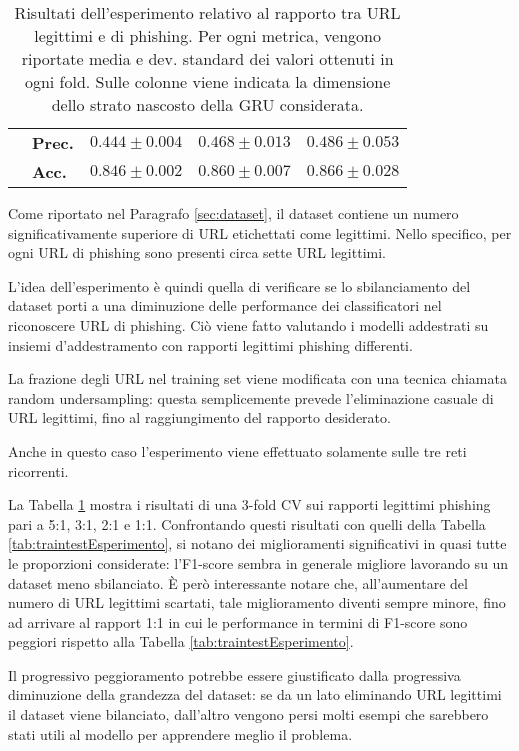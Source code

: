 \documentclass[../../main.tex]{subfiles}
\begin{document}
\begin{table}[ht]
\begin{tabular}{llccc}
            &\textbf{Prec.}     &      $0.444 \pm 0.004$ & $0.468 \pm 0.013$ & $0.486 \pm 0.053$\\
            &\textbf{Acc.}   &      $0.846 \pm 0.002$ & $0.860 \pm 0.007$ & $0.866 \pm 0.028$\\
            \bottomrule
        \end{tabular}
        \caption{Risultati dell'esperimento relativo al rapporto tra URL legittimi e di phishing. Per ogni metrica, vengono riportate media e dev. standard dei valori ottenuti in ogni fold. Sulle colonne viene indicata la dimensione dello strato nascosto della GRU considerata.}
        \label{tab:undersamplingEsperimento}
    \end{table}

    Come riportato nel Paragrafo \ref{sec:dataset}, il dataset contiene un numero significativamente superiore di URL etichettati come legittimi. Nello specifico, per ogni URL di phishing sono presenti circa sette URL legittimi.

    L'idea dell'esperimento è quindi quella di verificare se lo sbilanciamento del dataset porti a una diminuzione delle performance dei classificatori nel riconoscere URL di phishing. Ciò viene fatto valutando i modelli addestrati su insiemi d'addestramento con rapporti legittimi phishing differenti. 
    
    La frazione degli URL nel training set viene modificata con una tecnica chiamata random undersampling: questa semplicemente prevede l'eliminazione casuale di URL legittimi, fino al raggiungimento del rapporto desiderato. 
    
    Anche in questo caso l'esperimento viene effettuato solamente sulle tre reti ricorrenti.

    La Tabella \ref{tab:undersamplingEsperimento} mostra i risultati di una 3-fold CV sui rapporti legittimi phishing pari a 5:1, 3:1, 2:1 e 1:1. Confrontando questi risultati con quelli della Tabella \ref{tab:traintestEsperimento}, si notano dei miglioramenti significativi in quasi tutte le proporzioni considerate: l'F1-score sembra in generale migliore lavorando su un dataset meno sbilanciato. È però interessante notare che, all'aumentare del numero di URL legittimi scartati, tale miglioramento diventi sempre minore, fino ad arrivare al rapport 1:1 in cui le performance in termini di F1-score sono peggiori rispetto alla Tabella \ref{tab:traintestEsperimento}.

    Il progressivo peggioramento potrebbe essere giustificato dalla progressiva diminuzione della grandezza del dataset: se da un lato eliminando URL legittimi il dataset viene bilanciato, dall'altro vengono persi molti esempi che sarebbero stati utili al modello per apprendere meglio il problema.
\end{document}
